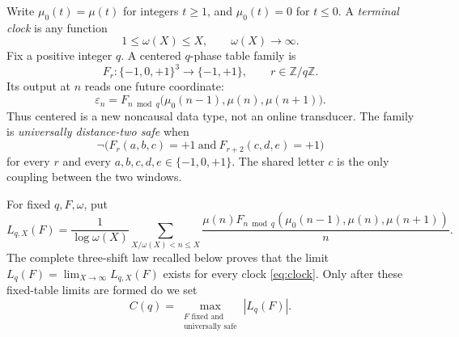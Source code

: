 \documentclass[11pt]{article}
\theoremstyle{definition}
\theoremstyle{remark}
\newcommand{\mob}{\mu}
\newcommand{\T}{\{-1,0,+1\}}
\newcommand{\Z}{\mathbb Z}
\begin{document}
Write \(\mob_0(t)=\mob(t)\) for integers \(t\geq1\), and
\(\mob_0(t)=0\) for \(t\leq0\).  A \emph{terminal clock} is any function
\begin{equation}
  1\leq\omega(X)\leq X,\qquad \omega(X)\longrightarrow\infty.
  \label{eq:clock}
\end{equation}
Fix a positive integer \(q\).  A centered \(q\)-phase table family is
\[
 F_r:\T^3\longrightarrow\{-1,+1\},\qquad r\in\Z/q\Z.
\]
Its output at \(n\) reads one future coordinate:
\begin{equation}
 \varepsilon_n
 =F_{n\bmod q}\bigl(\mob_0(n-1),\mob(n),\mob(n+1)\bigr).
 \label{eq:output}
\end{equation}
Thus centered is a new noncausal data type, not an online transducer.
The family is \emph{universally distance-two safe} when
\begin{equation}
 \neg\bigl(F_r(a,b,c)=+1\ \text{and}\
 F_{r+2}(c,d,e)=+1\bigr)
 \label{eq:safety}
\end{equation}
for every \(r\) and every \(a,b,c,d,e\in\T\).  The shared letter \(c\)
is the only coupling between the two windows.

For fixed \(q,F,\omega\), put
\begin{equation}
 L_{q,X}(F)=\frac1{\log\omega(X)}
 \sum_{X/\omega(X)<n\leq X}
 \frac{\mob(n)F_{n\bmod q}
  (\mob_0(n-1),\mob(n),\mob(n+1))}{n}.
 \label{eq:functional}
\end{equation}
The complete three-shift law recalled below proves that the limit
\(L_q(F)=\lim_{X\to\infty}L_{q,X}(F)\) exists for every clock
\eqref{eq:clock}.  Only after these fixed-table limits are formed do we set
\begin{equation}
 C(q)=\max_{\substack{F\text{ fixed and}\\\text{universally safe}}}
 |L_q(F)|.
 \label{eq:capacity}
\end{equation}
\end{document}
